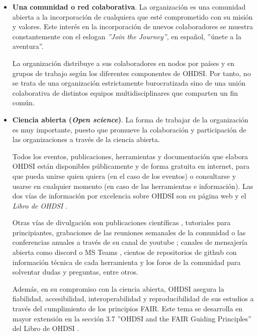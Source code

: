 \begin{itemize}

    \item \textbf{Una comunidad o red colaborativa}. La organización es una comunidad abierta a la incorporación de cualquiera que esté comprometido con su misión y valores. Este interés en la incorporación de nuevos colaboradores se muestra constantemente con el eslogan \textit{''Join the Journey''}, en español, ''únete a la aventura''.
    
    La organización distribuye a sus colaboradores en nodos por países y en grupos de trabajo según los diferentes componentes de OHDSI. Por tanto, no se trata de una organización estrictamente burocratizada sino de una unión colaborativa de distintos equipos multidisciplinares que comparten un fin común.

    \item \textbf{Ciencia abierta (\textit{Open science})}. La forma de trabajar de la organización es muy importante, puesto que promueve la colaboración y participación de las organizaciones a través de la ciencia abierta.

    Todos los eventos, publicaciones, herramientas y documentación que elabora OHDSI están disponibles públicamente y de forma gratuita en internet, para que pueda unirse quien quiera (en el caso de los eventos) o consultarse y usarse en cualquier momento (en caso de las herramientas e información). Las dos vías de información por excelencia sobre OHDSI son su página web \cite{OHDSIwebsite} y el \textit{Libro de OHDSI} \cite{OHDSIbook}. 
    
    Otras vías de divulgación son publicaciones científicas \cite{OHDSIpublications}, tutoriales para principiantes, grabaciones de las reuniones semanales de la comunidad o las conferencias anuales a través de su canal de youtube \cite{OHDSIyt}; canales de mensajería abierta como discord \cite{OHDSIdiscordInvitation} o MS Teams \cite{OHDSIofficeForm}, cientos de repositorios de github con información técnica de cada herramienta \cite{OHDSIgithub} y los foros de la comunidad \cite{OHDSIforums} para solventar dudas y preguntas, entre otros.

    Además, en su compromiso con la ciencia abierta, OHDSI asegura la fiabilidad, accesibilidad, interoperabilidad y reproducibilidad de sus estudios a través del cumplimiento de los principios FAIR. Este tema se desarrolla en mayor extensión en la sección 3.7 ''OHDSI and the FAIR Guiding Principles'' del Libro de OHDSI \cite{OHDSIbook}.


\end{itemize}

